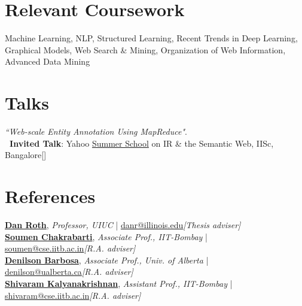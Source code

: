 \documentclass[margin,line]{templates/resume}
\newcommand{\myhref}[3][blue]{\href{#2}{\color{#1}{#3}}}
\newcommand{\compresslist}{%
\setlength{\itemsep}{3pt}%
\setlength{\parskip}{0pt}%
\setlength{\parsep}{0pt}%
}
\begin{document}
\begin{resume}
\section{\mysidestyle Relevant Coursework} 
Machine Learning, NLP, Structured Learning, Recent Trends in Deep Learning, Graphical Models, Web Search \& Mining, Organization of Web Information, Advanced Data Mining


\vspace{-0.1cm}
\section{\mysidestyle Talks}
\vspace{0mm}
\textit{``Web-scale Entity Annotation Using MapReduce"}. \\
\textbf{\ Invited Talk}: Yahoo \href{https://www.eventbrite.com/e/yahoo-summer-school-2013-registration-6688943811#}{Summer School} on IR \& the Semantic Web, IISc, Bangalore\hfill{[\myhref[darkblue]{https://github.com/shatu/shatu.github.io/blob/master/talks/HadoopAnnot.ppt}{Slides}]}

\vspace{-0.2cm}    
\section{\mysidestyle References} 
\textbf{\textsf{\href{http://www.cis.upenn.edu/~danroth/}{Dan Roth}}}, \textit{Professor, UIUC} | \href{mailto:danr@illinois.edu}{danr@illinois.edu}\hfill{\textit{[Thesis adviser]}}
\vspace{0.8mm}
\\
\textbf{\textsf{\href{https://www.cse.iitb.ac.in/~soumen/}{Soumen Chakrabarti}}}, \textit{Associate Prof., IIT-Bombay} | \href{mailto:soumen@cse.iitb.ac.in}{soumen@cse.iitb.ac.in}\hfill{\textit{[R.A. adviser]}}
\vspace{0.8mm}
\\
\textbf{\textsf{\href{https://sites.ualberta.ca/~denilson/}{Denilson Barbosa}}}, \textit{Associate Prof., Univ. of Alberta} | \href{mailto:denilson@ualberta.ca}{denilson@ualberta.ca}\hfill{\textit{[R.A. adviser]}}
\vspace{0.8mm}
\\
\textbf{\textsf{\href{https://www.cse.iitb.ac.in/~shivaram/}{Shivaram Kalyanakrishnan}}}, \textit{Assistant Prof., IIT-Bombay} | \href{mailto:shivaram@cse.iitb.ac.in}{shivaram@cse.iitb.ac.in}\hfill{\textit{[R.A. adviser]}}


\end{resume}
\end{document}
